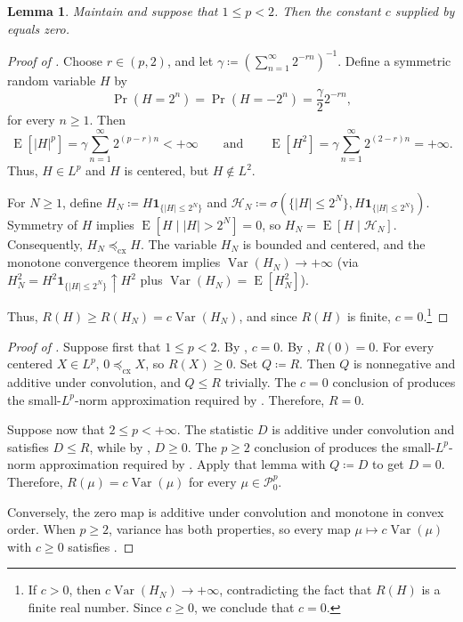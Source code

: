 \documentclass[11pt]{amsart}
\theoremstyle{plain}
\newtheorem{lemma}{Lemma}
\theoremstyle{definition}
\theoremstyle{remark}
\numberwithin{equation}{section}
\newcommand{\1}{\mathbf 1}
\begin{document}
\begin{lemma}\label{lem:subquadratic-calibration}
Maintain  and suppose that \(1\leq p<2\). Then the constant \(c\) supplied by  equals zero.
\end{lemma}

\begin{proof}[Proof of ]
Choose \(r\in(p,2)\), and let \(\gamma\coloneqq\left(\sum_{n=1}^{\infty}2^{-rn}\right)^{-1}\). Define a symmetric random variable \(H\) by
\[
\Pr(H=2^n)=\Pr(H=-2^n)=\frac{\gamma}{2}2^{-rn},
\]
for every \(n\geq1\). Then
\[
\operatorname{E}[|H|^p]
=\gamma\sum_{n=1}^{\infty}2^{(p-r)n}
<+\infty
\qquad \text{and} \qquad
\operatorname{E}[H^2]
=\gamma\sum_{n=1}^{\infty}2^{(2-r)n}
=+\infty.
\]
Thus, \(H\in L^p\) and \(H\) is centered, but \(H\notin L^2\).

For \(N\geq1\), define \(H_N \coloneqq H\mathbf 1_{\{|H|\leq2^N\}}\) and \(\mathcal H_N \coloneqq\sigma\left(\{|H|\leq2^N\},H\mathbf 1_{\{|H|\leq2^N\}}\right)\). Symmetry of \(H\) implies \(\operatorname{E}[H\mid |H|>2^N]=0\), so \(H_N=\operatorname{E}[H\mid\mathcal H_N]\). Consequently, \(H_N\preceq_{\mathrm{cx}}H\). The variable \(H_N\) is bounded and centered, and the monotone convergence theorem implies \(\operatorname{Var}(H_N)\to+\infty\) (via \(H_N^2
=
H^2\mathbf 1_{\{|H|\leq2^N\}}
\uparrow H^2\) plus \(\operatorname{Var}(H_N)
=
\operatorname{E}[H_N^2]\)). 

Thus, \(R(H)\geq R(H_N)=c\operatorname{Var}(H_N)\), and  since \(R(H)\) is finite, \(c=0\).\footnote{If \(c>0\), then \(c\operatorname{Var}(H_N)\to+\infty\), contradicting the fact that \(R(H)\) is a finite real number. Since \(c\geq0\), we conclude that \(c=0\).}
\end{proof}

\begin{proof}[Proof of ]
Suppose first that \(1\leq p<2\). By , \(c=0\). By , \(R(0)=0\). For every centered \(X\in L^p\), \(0\preceq_{\mathrm{cx}}X\), so \(R(X)\geq0\). Set \(Q\coloneqq R\). Then \(Q\) is nonnegative and additive under convolution, and \(Q\leq R\) trivially. The \(c=0\) conclusion of  produces the small-\(L^p\)-norm approximation required by . Therefore, \(R=0\).

Suppose now that \(2\leq p<+\infty\). The statistic \(D\) is additive under convolution and satisfies \(D\leq R\), while by , \(D\geq0\). The \(p\geq2\) conclusion of  produces the small-\(L^p\)-norm approximation required by . Apply that lemma with \(Q\coloneqq D\) to get \(D=0\). Therefore,
\(R(\mu)=c\operatorname{Var}(\mu)\) for every
\(\mu\in\mathcal P_0^p\).

Conversely, the zero map is additive under convolution and monotone in convex order. When \(p\geq2\), variance has both properties, so every map
\(\mu\mapsto c\operatorname{Var}(\mu)\) with \(c\geq0\) satisfies
.
\end{proof}
\end{document}
